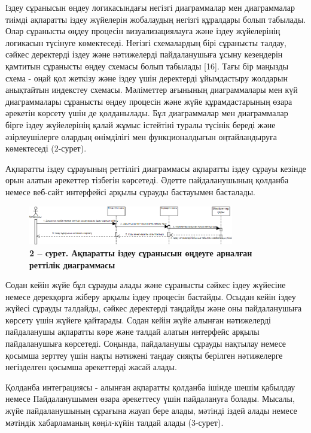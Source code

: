 Іздеу сұранысын өңдеу логикасындағы негізгі диаграммалар мен
диаграммалар тиімді ақпаратты іздеу жүйелерін жобалаудың негізгі
құралдары болып табылады. Олар сұранысты өңдеу процесін
визуализациялауға және іздеу жүйелерінің логикасын түсінуге көмектеседі.
Негізгі схемалардың бірі сұранысты талдау, сәйкес деректерді іздеу және
нәтижелерді пайдаланушыға ұсыну кезеңдерін қамтитын сұранысты өңдеу
схемасы болып табылады {[}16{]}. Тағы бір маңызды схема - оңай қол
жеткізу және іздеу үшін деректерді ұйымдастыру жолдарын анықтайтын
индекстеу схемасы. Мәліметтер ағынының диаграммалары мен күй
диаграммалары сұранысты өңдеу процесін және жүйе құрамдастарының өзара
әрекетін көрсету үшін де қолданылады. Бұл диаграммалар мен диаграммалар
бірге іздеу жүйелерінің қалай жұмыс істейтіні туралы түсінік береді және
әзірлеушілерге олардың өнімділігі мен функционалдығын оңтайландыруға
көмектеседі (2-сурет).

Ақпаратты іздеу сұрауының реттілігі диаграммасы ақпаратты іздеу сұрауы
кезінде орын алатын әрекеттер тізбегін көрсетеді. Әдетте пайдаланушының
қолданба немесе веб-сайт интерфейсі арқылы сұрауды бастауымен басталады.

\begin{figure}[H]
	\centering
	\includegraphics[width=0.8\textwidth]{assets/143}
	\caption*{\bfseries 2 -- сурет. Ақпаратты іздеу сұранысын өңдеуге арналған реттілік
  диаграммасы}
\end{figure}

Содан кейін жүйе бұл сұрауды алады және сұранысты сәйкес іздеу жүйесіне
немесе дерекқорға жіберу арқылы іздеу процесін бастайды. Осыдан кейін
іздеу жүйесі сұрауды талдайды, сәйкес деректерді таңдайды және оны
пайдаланушыға көрсету үшін жүйеге қайтарады. Содан кейін жүйе алынған
нәтижелерді пайдаланушы ақпаратты көре және талдай алатын интерфейс
арқылы пайдаланушыға көрсетеді. Соңында, пайдаланушы сұрауды нақтылау
немесе қосымша зерттеу үшін нақты нәтижені таңдау сияқты берілген
нәтижелерге негізделген қосымша әрекеттерді жасай алады.

Қолданба интеграциясы - алынған ақпаратты қолданба ішінде шешім қабылдау
немесе Пайдаланушымен өзара әрекеттесу үшін пайдалануға болады. Мысалы,
жүйе пайдаланушының сұрағына жауап бере алады, мәтінді іздей алады
немесе мәтіндік хабарламаның көңіл-күйін талдай алады (3-сурет).

